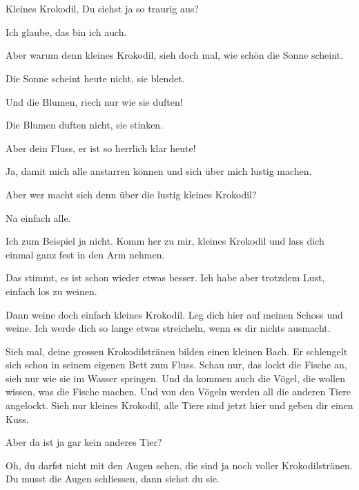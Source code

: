 \chapter*{}



Kleines Krokodil, Du siehst ja so traurig aus?

Ich glaube, das bin ich auch.

Aber warum denn kleines Krokodil, sieh doch mal, wie schön die Sonne scheint.

Die Sonne scheint heute nicht, sie blendet.

Und die Blumen, riech nur wie sie duften!

Die Blumen duften nicht, sie stinken.

Aber dein Fluss, er ist so herrlich klar heute!

Ja, damit mich alle anstarren können und sich über mich lustig machen.

Aber wer macht sich denn über die lustig kleines Krokodil?

Na einfach alle.

Ich zum Beispiel ja nicht. Komm her zu mir, kleines Krokodil und lass dich einmal ganz fest in den Arm nehmen.

Das stimmt, es ist schon wieder etwas besser. Ich habe aber trotzdem Lust, einfach los zu weinen.

Dann weine doch einfach kleines Krokodil. Leg dich hier auf meinen Schoss und weine. Ich werde dich so lange etwas streicheln, wenn es dir nichts ausmacht.



Sieh mal, deine grossen Krokodilstränen bilden einen kleinen Bach. Er schlengelt sich schon in seinem eigenen Bett zum Fluss. Schau nur, das lockt die Fische an, sieh nur wie sie im Wasser springen. Und da kommen auch die Vögel, die wollen wissen, was die Fische machen. Und von den Vögeln werden all die anderen Tiere angelockt. Sieh nur kleines Krokodil, alle Tiere sind jetzt hier und geben dir einen Kuss.

Aber da ist ja gar kein anderes Tier?

Oh, du darfst nicht mit den Augen sehen, die sind ja noch voller Krokodilstränen. Du musst die Augen schliessen, dann siehst du sie.


